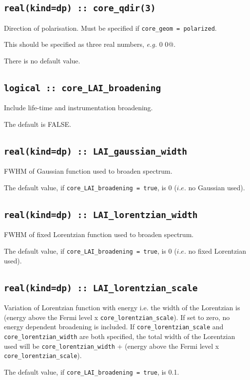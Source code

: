 \documentclass[a4paper,11pt,twoside]{book}
\begin{document}
{\subsection[core\_qdir]{\tt real(kind=dp) :: core\_qdir(3)}
Direction of polarisation. Must be specified if \verb#core_geom = polarized#.

This should be specified as three real numbers, \emph{e.g.}  0 0@.

There is no default value.

\subsection[core\_LAI\_broadening]{\tt logical :: core\_LAI\_broadening}
Include life-time and instrumentation broadening.

The default is FALSE.

\subsection[core\_gaussian\_width]{\tt real(kind=dp) :: LAI\_gaussian\_width}
FWHM of Gaussian function used to broaden spectrum.

The default value, if \verb#core_LAI_broadening = true#, is 0 ($i.e.$ no Gaussian used).

\subsection[core\_lorentzian\_width]{\tt real(kind=dp) :: LAI\_lorentzian\_width}
FWHM of fixed Lorentzian function used to broaden spectrum.

The default value, if \verb#core_LAI_broadening = true#, is 0 ($i.e.$ no fixed Lorentzian used).

\subsection[core\_lorentzian\_scale]{\tt real(kind=dp) :: LAI\_lorentzian\_scale}
Variation of Lorentzian function with energy i.e. the width of the Lorentzian is (energy above the Fermi level x
\verb#core_lorentzian_scale#).  If set to zero, no energy dependent broadening is included.
If \verb#core_lorentzian_scale# and \verb#core_lorentzian_width# are both specified, the
total width of the Lorentzian used will be \verb#core_lorentzian_width# + (energy above the Fermi level x
\verb#core_lorentzian_scale#).

The default value, if \verb#core_LAI_broadening = true#, is 0.1.

}
\end{document}
